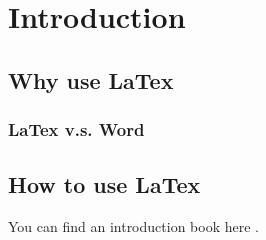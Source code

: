 
\chapter{Introduction}\label{introduction}

\section{Why use LaTex}

\subsection{LaTex v.s. Word}

\section{How to use LaTex}

You can find an introduction book here \cite{ATEX2e2018}.